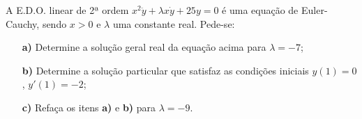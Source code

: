 \linespread{1.5}
A E.D.O. linear de 2ª ordem $x^2\ddot{y} + \lambda x\dot{y} + 25y = 0$ é uma equação de Euler-Cauchy, sendo $x>0$ e $\lambda$ uma constante real. Pede-se:
\begin{itemize}
    \item[\textbf{a)}] Determine a solução geral real da equação acima para $\lambda = -7$;
    \item[\textbf{b)}] Determine a solução particular que satisfaz as condições iniciais $y(1) = 0$, $y'(1) = -2$;
    \item[\textbf{c)}] Refaça os itens \textbf{a)} e \textbf{b)} para $\lambda = -9$.
\end{itemize} 